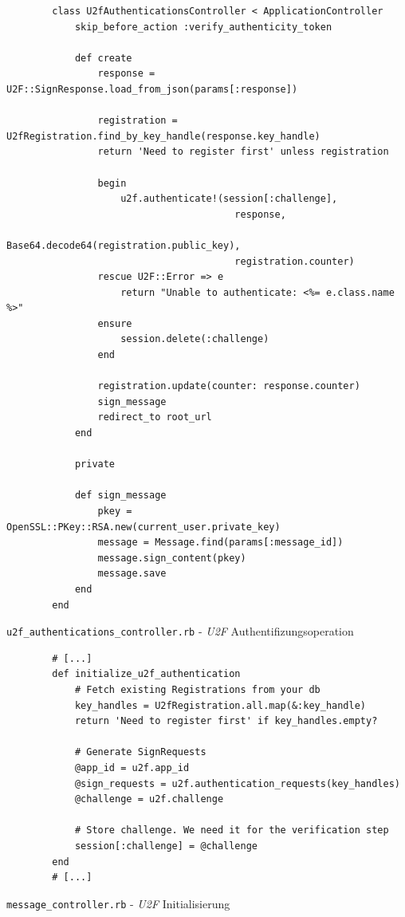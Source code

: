 \documentclass[11pt,a4paper,ngerman]{scrreprt}
\begin{document}
\begin{listing}[htpb]
    \begin{verbatim}
        class U2fAuthenticationsController < ApplicationController
            skip_before_action :verify_authenticity_token

            def create
                response = U2F::SignResponse.load_from_json(params[:response])

                registration = U2fRegistration.find_by_key_handle(response.key_handle)
                return 'Need to register first' unless registration

                begin
                    u2f.authenticate!(session[:challenge],
                                        response,
                                        Base64.decode64(registration.public_key),
                                        registration.counter)
                rescue U2F::Error => e
                    return "Unable to authenticate: <%= e.class.name %>"
                ensure
                    session.delete(:challenge)
                end

                registration.update(counter: response.counter)
                sign_message
                redirect_to root_url
            end

            private

            def sign_message
                pkey = OpenSSL::PKey::RSA.new(current_user.private_key)
                message = Message.find(params[:message_id])
                message.sign_content(pkey)
                message.save
            end
        end
    \end{verbatim}
    \caption{\texttt{u2f\_authentications\_controller.rb} - \textit{U2F} Authentifizungsoperation}
    \label{lst:u2f_authentications_controller.rb}
\end{listing}
\begin{listing}[htpb]
    \begin{verbatim}
        # [...]
        def initialize_u2f_authentication
            # Fetch existing Registrations from your db
            key_handles = U2fRegistration.all.map(&:key_handle)
            return 'Need to register first' if key_handles.empty?
        
            # Generate SignRequests
            @app_id = u2f.app_id
            @sign_requests = u2f.authentication_requests(key_handles)
            @challenge = u2f.challenge
        
            # Store challenge. We need it for the verification step
            session[:challenge] = @challenge
        end
        # [...]
    \end{verbatim}
    \caption{\texttt{message\_controller.rb} - \textit{U2F} Initialisierung}
    \label{lst:message_controller.rb-u2f}
\end{listing}
\clearpage
\end{document}
